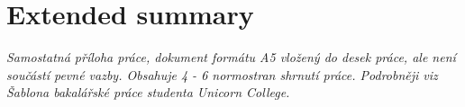 \chapter*{Extended summary}
\emph{Samostatná příloha práce, dokument formátu A5 vložený do desek práce, ale není součástí pevné vazby. Obsahuje 4 - 6 normostran shrnutí práce. Podrobněji viz Šablona bakalářské práce studenta Unicorn College.}
